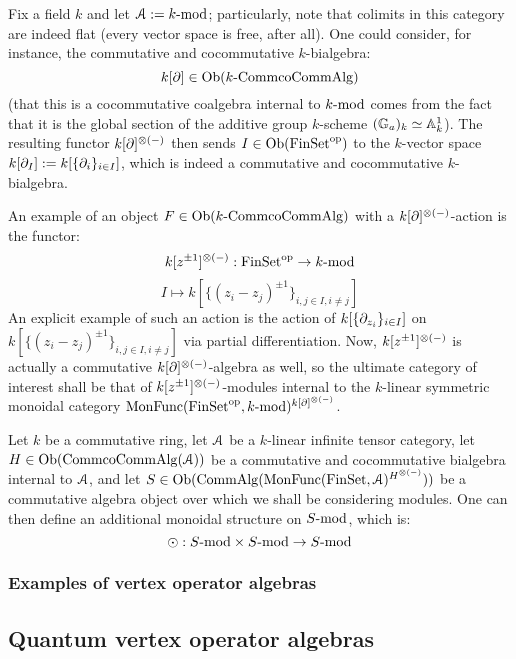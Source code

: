             \begin{example}
                Fix a field $k$ and let $\calA := k\mod$; particularly, note that colimits in this category are indeed flat (every vector space is free, after all). One could consider, for instance, the commutative and cocommutative $k$-bialgebra:
                    $$k[\del] \in \Ob(k\-\Comm\co\Comm\Alg)$$
                (that this is a cocommutative coalgebra internal to $k\mod$ comes from the fact that it is the global section of the additive group $k$-scheme $(\G_a)_k \cong \A^1_k$). The resulting functor $k[\del]^{\tensor (-)}$ then sends $I \in \Ob(\Fin\Sets^{\op})$ to the $k$-vector space $k[\del_I] := k[\{\del_i\}_{i \in I}]$, which is indeed a commutative and cocommutative $k$-bialgebra.
                
                An example of an object $F \in \Ob(k\-\Comm\co\Comm\Alg)$ with a $k[\del]^{\tensor (-)}$-action is the functor:
                    $$k[z^{\pm 1}]^{\tensor (-)}: \Fin\Sets^{\op} \to k\mod$$
                    $$I \mapsto k[\{(z_i - z_j)^{\pm 1}\}_{i, j \in I, i \not = j}]$$
                An explicit example of such an action is the action of $k[\{\del_{z_i}\}_{i \in I}]$ on $k[\{(z_i - z_j)^{\pm 1}\}_{i, j \in I, i \not = j}]$ via partial differentiation. Now, $k[z^{\pm 1}]^{\tensor (-)}$ is actually a commutative $k[\del]^{\tensor (-)}$-algebra as well, so the ultimate category of interest shall be that of $k[z^{\pm 1}]^{\tensor (-)}$-modules internal to the $k$-linear symmetric monoidal category $\Mon\Func(\Fin\Sets^{\op}, k\mod)^{k[\del]^{\tensor (-)}}$. 
            \end{example}
            
            \begin{definition} \label{def: singular_tensor_products}
                Let $k$ be a commutative ring, let $\calA$ be a $k$-linear infinite tensor category, let $H \in \Ob(\Comm\co\Comm\Alg(\calA))$ be a commutative and cocommutative bialgebra internal to $\calA$, and let $S \in \Ob(\Comm\Alg( \Mon\Func(\Fin\Sets, \calA)^{H^{\tensor (-)}} ))$ be a commutative algebra object over which we shall be considering modules. One can then define an additional monoidal structure on $S\mod$, which is:
                    $$\singtensor: S\mod \x S\mod \to S\mod$$
            \end{definition}
        
        \subsubsection{Examples of vertex operator algebras}
    
    \subsection{Quantum vertex operator algebras}